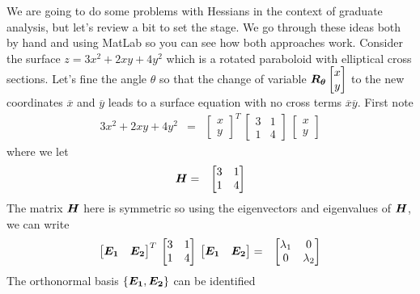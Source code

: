 \documentclass[11pt]{SelfArxOneColBMN}
\begin{document}
We are going to do some problems with Hessians in the context
of graduate analysis, but let's review a bit to set the stage.
We go through  these ideas both by
hand and using MatLab so you can see how both approaches work.
Consider the surface $z = 3x^2 + 2xy + 4y^2$ which is a rotated
paraboloid with elliptical cross sections.  Let's fine the angle $\theta$ so that
the change of variable $\boldsymbol{R_{\theta}} \begin{bmatrix} x \\y \end{bmatrix}$
to the new coordinates $\overline{x}$ and $\overline{y}$ leads to a surface
equation with no cross terms $\overline{x} \overline{y}$.  First note
\begin{eqnarray*}
3x^2 + 2xy + 4y^2 &=&
\begin{bmatrix} x\\y\end{bmatrix}^T 
\: \begin{bmatrix} 3 & 1 \\ 1 & 4 \end{bmatrix}
\: \begin{bmatrix} x\\y\end{bmatrix}
\end{eqnarray*}
\noindent
where we let
\begin{eqnarray*}
\boldsymbol{H} &=& \begin{bmatrix} 3 & 1 \\ 1 & 4 \end{bmatrix}
\end{eqnarray*}
\noindent
The matrix $\boldsymbol{H}$ here is symmetric so using the eigenvectors and eigenvalues 
of $\boldsymbol{H}$,
we can write
\begin{eqnarray*}
\begin{bmatrix} \boldsymbol{E_1} & \boldsymbol{E_2}\end{bmatrix}^T
\: \begin{bmatrix} 3 & 1 \\ 1 & 4 \end{bmatrix}
\: \begin{bmatrix} \boldsymbol{E_1} & \boldsymbol{E_2}\end{bmatrix}
&=&
\begin{bmatrix} \lambda_1 & 0 \\ 0 & \lambda_2 \end{bmatrix}
\end{eqnarray*}
\noindent
The orthonormal basis $\{ \boldsymbol{E_1}, \boldsymbol{E_2}\}$ can be identified
\end{document}
